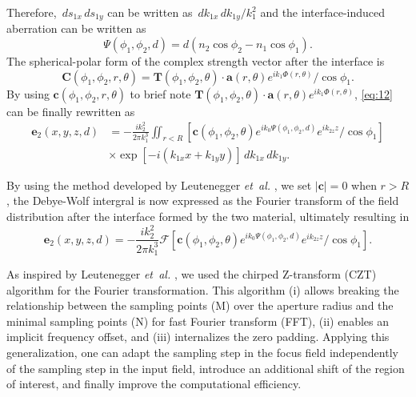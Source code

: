 \documentclass[9pt,twocolumn,twoside]{osajnl}
\begin{document}
Therefore, $\,ds_{1x}\,ds_{1y}$ can be written as $\,dk_{1x}\,dk_{1y}/k_1^2$ and the interface-induced aberration can be written as 
\begin{equation}\label{eq:14}
	\Psi(\phi_1,\phi_2,d)=d(n_2\cos\phi_2-n_1\cos\phi_1).
\end{equation}
The spherical-polar form of the complex strength vector after the interface is
\begin{equation}\label{eq:15}
	\mathbf{C}(\phi_1,\phi_2,r,\theta)=\mathbf{T}(\phi_1,\phi_2,\theta)\cdot\mathbf{a}(r,\theta)e^{ik_1\Phi(r,\theta)}/\cos\phi_1.
\end{equation}
By using $\mathbf{c}(\phi_1,\phi_2,r,\theta)$ to brief note $\mathbf{T}(\phi_1,\phi_2,\theta)\cdot\mathbf{a}(r,\theta)e^{ik_1\Phi(r,\theta)}$, \eqref{eq:12} can be finally rewritten as
\begin{equation}
	\begin{aligned}\label{eq:16}
		\mathbf{e}_2(x,y,z,d)&=-\frac{ik^2_2}{2\pi k^3_1}
		\iint_{r<R}[\mathbf{c}(\phi_1,\phi_2,\theta)e^{ik_0\Psi(\phi_1,\phi_2,d)}e^{ik_{2z}z}/\cos\phi_1]\\
		&\times \exp[-i(k_{1x}x+k_{1y}y)]\,dk_{1x}\,dk_{1y}.
	\end{aligned}
\end{equation}

By using the method developed by Leutenegger \emph{et~al.} \cite{leutenegger2006fast}, we set $|\mathbf{c}|=0$ when $r>R$, the Debye-Wolf intergral is now expressed as the Fourier transform of the field distribution after the interface formed by the two material, ultimately resulting in
\begin{equation}\label{eq:17}
	\mathbf{e}_2(x,y,z,d)=-\frac{ik^2_2}{2\pi k^3_1}\mathcal{F}[\mathbf{c}(\phi_1,\phi_2,\theta)e^{ik_0\Psi(\phi_1,\phi_2,d)}e^{ik_{2z}z}/\cos\phi_1].
\end{equation}

As inspired by Leutenegger \emph{et~al.} \cite{leutenegger2006fast}, we used the chirped Z-transform (CZT) algorithm \cite{Bakx2002} for the Fourier transformation. This algorithm (i) allows breaking the relationship between the sampling points (M) over the aperture radius and the minimal sampling points (N) for fast Fourier transform (FFT), (ii) enables an implicit frequency offset, and (iii) internalizes the zero padding. Applying this generalization, one can adapt the sampling step in the focus field independently of the sampling step in the input field, introduce an additional shift of the region of interest, and finally improve the computational efficiency.
\end{document}
